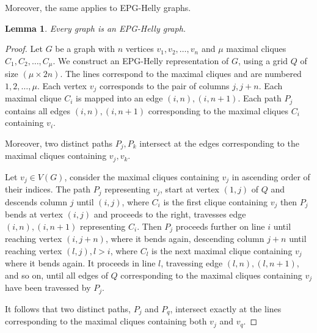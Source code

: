 \documentclass[preprint,12pt]{elsarticle} %
\newtheorem{lema}[theorem]{Lemma}
\begin{document}
 Moreover, the same applies to EPG-Helly graphs. 
 
 \begin{lema}\label{lem:todoGrafoEpgHelly}
 Every graph is an EPG-Helly graph.
 \end{lema}
  \begin{proof}
  Let $G$ be a graph with $n$ vertices $v_1, v_2, \dots, v_n$ and $\mu$ maximal cliques $C_1, C_2, \dots , C_{\mu }$. We construct an EPG-Helly representation of $G$, using a grid $Q$ of size $(\mu \times 2n)$. The lines correspond to the maximal cliques and are numbered $1, 2, \dots , \mu$. Each vertex $v_j$ corresponds to the pair of columns $j, j+n$. Each maximal clique $C_i$ is mapped into an edge $(i,n), (i,n+1)$. Each path $P_j$ contains all edges $(i,n), (i,n+1)$ corresponding to the maximal cliques $C_i$ containing $v_i$.
  
  Moreover, two distinct paths $P_j,P_k$ intersect at the edges corresponding to the maximal cliques containing $v_j,v_k$.
  
  Let $v_j \in V(G)$, consider the maximal cliques containing $v_j$ in ascending order of their indices. The path $P_j$ representing $v_j$, start at vertex $(1,j)$ of $Q$ and descends column $j$ until $(i,j)$, where $C_i$ is the first clique containing $v_j$ then $P_j$ bends at vertex $(i,j)$ and proceeds to the right, travesses edge $(i,n), (i,n+1)$ representing $C_i$. Then $P_j$ proceeds further on line $i$ until reaching vertex $(i, j+n)$, where it bends again, descending column $j+n$ until reaching vertex $(l,j), l>i$, where $C_l$ is the next maximal clique containing $v_j$ where it bends again. It proceeds in line $l$, travessing edge $(l,n),(l,n+1)$, and so on, until all edges of $Q$ corresponding to the maximal cliques containing $v_j$ have been travessed by $P_j$.   
  
It follows that two distinct paths, $P_j$ and $P_q$, intersect exactly at the lines corresponding to the maximal cliques containing both $v_j$ and $v_q$.  
  

\end{proof}
\end{document}
